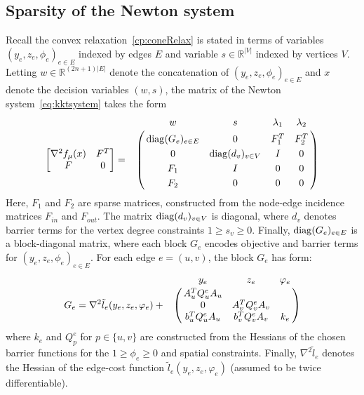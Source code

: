 \documentclass[letterpaper, 11pt]{article}
\begin{document}
\subsection{Sparsity of the Newton system}
Recall the convex relaxation~\eqref{cp:coneRelax} is stated in terms of variables
$(y_e, z_e, \phi_e)_{e \in E}$ indexed by edges $E$ and variable $s \in \mathbb{R}^{|V|}$ indexed by vertices $V$.
Letting $w \in \mathbb{R}^{(2n+1)|E|}$ denote the concatenation of $(y_e, z_e, \phi_e)_{e \in E}$
and $x$ denote the decision variables $(w, s)$, the 
matrix of the Newton system~\eqref{eq:kktsystem} takes the form
\begin{align}
  \begin{bmatrix}
    \nabla^2 f_\mu(x)  & F^T  \\
    F  & 0 
  \end{bmatrix} = 
  \bordermatrix{~& w & s & \lambda_1 & \lambda_2  \cr
  &  \diag(G_e)_{e \in E}  & 0  &  F_1^T & F_2^T  \cr
  &  0  & \diag(d_v)_{v \in V}   & I & 0\cr
  &  F_1  & I & 0  & 0 \cr
  &  F_2  & 0 & 0  & 0\cr
  }
\end{align}
Here,  $F_1$ and $F_2$ are sparse matrices, constructed from the node-edge incidence matrices $F_{in}$ and $F_{out}$.
The matrix $\operatorname*{diag}(d_v)_{v \in V}$ is diagonal, where $d_v$ denotes barrier terms for the vertex degree constraints $1 \ge s_v \ge 0$.
Finally, $\operatorname*{diag}(G_e)_{e \in E}$ is a block-diagonal matrix, 
where each block $G_e$ encodes objective and barrier terms for $(y_e, z_e, \phi_e)_{e \in E}$. For each edge $e=(u,v)$, the block $G_e$ has form:
\[
G_e =
\nabla^2 \tilde l_e(y_e, z_e, \varphi_e) +
  \bordermatrix{~& y_e & z_e & \varphi_e  \cr
&  A_u^T Q^e_u A_u  \cr
&    0          & A_v^T Q^e_v A_v \cr
&   b_u^T Q^e_u A_u    & b_v^T Q^e_v A_v      &  k_e  \cr
 }
\]
where $k_{e}$ and  $Q^e_p$ for $p \in \{u, v\}$ are constructed from the Hessians
of the chosen barrier functions
for the $1 \ge \phi_e \ge 0$ and spatial constraints.
Finally, $\nabla^2 \tilde l_e$ denotes the Hessian of  the edge-cost function $\tilde l_e(y_e, z_e, \varphi_e)$
(assumed to be twice differentiable).



\end{document}
